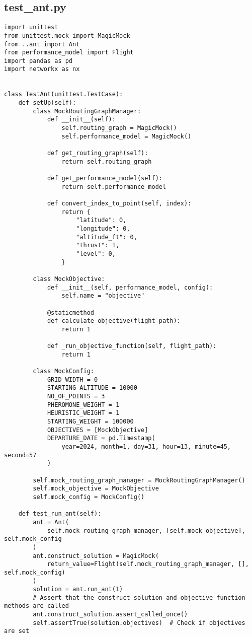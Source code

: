 \subsection{test_ant.py}
\begin{verbatim}
import unittest
from unittest.mock import MagicMock
from ..ant import Ant
from performance_model import Flight
import pandas as pd
import networkx as nx


class TestAnt(unittest.TestCase):
    def setUp(self):
        class MockRoutingGraphManager:
            def __init__(self):
                self.routing_graph = MagicMock()
                self.performance_model = MagicMock()

            def get_routing_graph(self):
                return self.routing_graph

            def get_performance_model(self):
                return self.performance_model

            def convert_index_to_point(self, index):
                return {
                    "latitude": 0,
                    "longitude": 0,
                    "altitude_ft": 0,
                    "thrust": 1,
                    "level": 0,
                }

        class MockObjective:
            def __init__(self, performance_model, config):
                self.name = "objective"

            @staticmethod
            def calculate_objective(flight_path):
                return 1

            def _run_objective_function(self, flight_path):
                return 1

        class MockConfig:
            GRID_WIDTH = 0
            STARTING_ALTITUDE = 10000
            NO_OF_POINTS = 3
            PHEROMONE_WEIGHT = 1
            HEURISTIC_WEIGHT = 1
            STARTING_WEIGHT = 100000
            OBJECTIVES = [MockObjective]
            DEPARTURE_DATE = pd.Timestamp(
                year=2024, month=1, day=31, hour=13, minute=45, second=57
            )

        self.mock_routing_graph_manager = MockRoutingGraphManager()
        self.mock_objective = MockObjective
        self.mock_config = MockConfig()

    def test_run_ant(self):
        ant = Ant(
            self.mock_routing_graph_manager, [self.mock_objective], self.mock_config
        )
        ant.construct_solution = MagicMock(
            return_value=Flight(self.mock_routing_graph_manager, [], self.mock_config)
        )
        solution = ant.run_ant(1)
        # Assert that the construct_solution and objective_function methods are called
        ant.construct_solution.assert_called_once()
        self.assertTrue(solution.objectives)  # Check if objectives are set


\end{verbatim}
